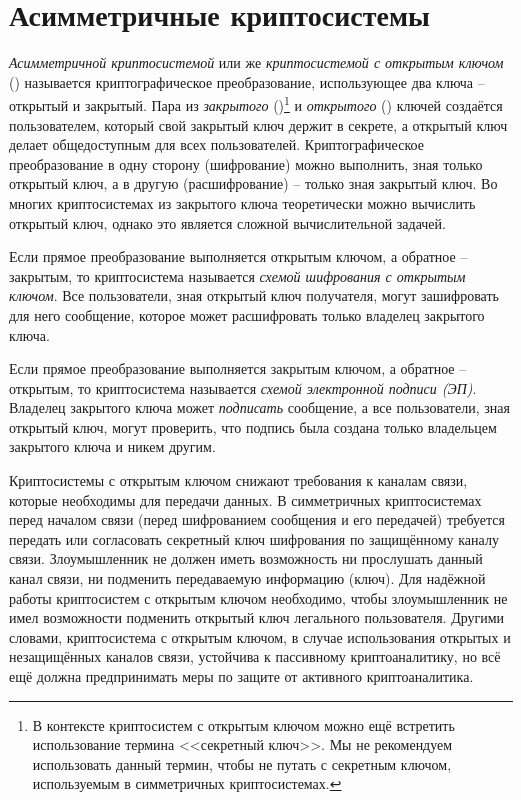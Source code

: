 \chapter{Асимметричные криптосистемы}\label{chapter-public-key}

\emph{Асимметричной криптосистемой} или же \emph{криптосистемой с открытым ключом} () называется криптографическое преобразование, использующее два ключа -- открытый и закрытый. Пара из \emph{закрытого} ()\footnote{В контексте криптосистем с открытым ключом можно ещё встретить использование термина <<секретный ключ>>. Мы не рекомендуем использовать данный термин, чтобы не путать с секретным ключом, используемым в симметричных криптосистемах.} и \emph{открытого} () ключей создаётся пользователем, который свой закрытый ключ держит в секрете, а открытый ключ делает общедоступным для всех пользователей. Криптографическое преобразование в одну сторону (шифрование) можно выполнить, зная только открытый ключ, а в другую (расшифрование) -- только зная закрытый ключ. Во многих криптосистемах из закрытого ключа теоретически можно вычислить открытый ключ, однако это является сложной вычислительной задачей.

Если прямое преобразование выполняется открытым ключом, а обратное -- закрытым, то криптосистема называется \emph{схемой шифрования с открытым ключом}. Все пользователи, зная открытый ключ получателя, могут зашифровать для него сообщение, которое может расшифровать только владелец закрытого ключа.

Если прямое преобразование выполняется закрытым ключом, а обратное -- открытым, то криптосистема называется \emph{схемой электронной подписи (ЭП)}. Владелец закрытого ключа может \emph{подписать} сообщение, а все пользователи, зная открытый ключ, могут проверить, что подпись была создана только владельцем закрытого ключа и никем другим.

Криптосистемы с открытым ключом снижают требования к каналам связи, которые необходимы для передачи данных. В симметричных криптосистемах перед началом связи (перед шифрованием сообщения и его передачей) требуется передать или согласовать секретный ключ шифрования по защищённому каналу связи. Злоумышленник не должен иметь возможность ни прослушать данный канал связи, ни подменить передаваемую информацию (ключ). Для надёжной работы криптосистем с открытым ключом необходимо, чтобы злоумышленник не имел возможности подменить открытый ключ легального пользователя. Другими словами, криптосистема с открытым ключом, в случае использования открытых и незащищённых каналов связи, устойчива к пассивному криптоаналитику, но всё ещё должна предпринимать меры по защите от активного криптоаналитика.

